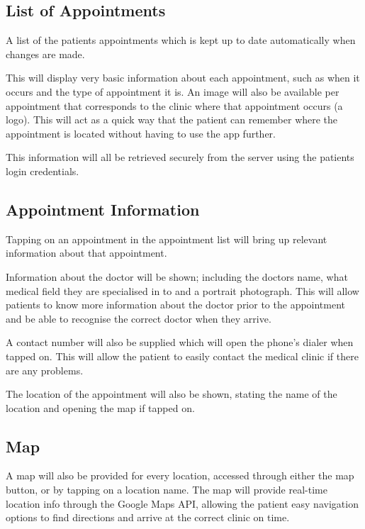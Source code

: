 \subsection{List of Appointments}

A list of the patients appointments which is kept up to date automatically when changes are made. 

This will display very basic information about each appointment, such as when it occurs and the type of appointment it is. An image will also be available per appointment that corresponds to the clinic where that appointment occurs (a logo). This will act as a quick way that the patient can remember where the appointment is located without having to use the app further.

This information will all be retrieved securely from the server using the patients login credentials.

\subsection{Appointment Information}

Tapping on an appointment in the appointment list will bring up relevant information about that appointment.

Information about the doctor will be shown; including the doctors name, what medical field they are specialised in to and a portrait photograph. This will allow patients to know more information about the doctor prior to the appointment and be able to recognise the correct doctor when they arrive.

A contact number will also be supplied which will open the phone's dialer when tapped on. This will allow the patient to easily contact the medical clinic if there are any problems.

The location of the appointment will also be shown, stating the name of the location and opening the map if tapped on.

\subsection{Map}

A map will also be provided for every location, accessed through either the map button, or by tapping on a location name. The map will provide real-time location info through the Google Maps API, allowing the patient easy navigation options to find directions and arrive at the correct clinic on time.

